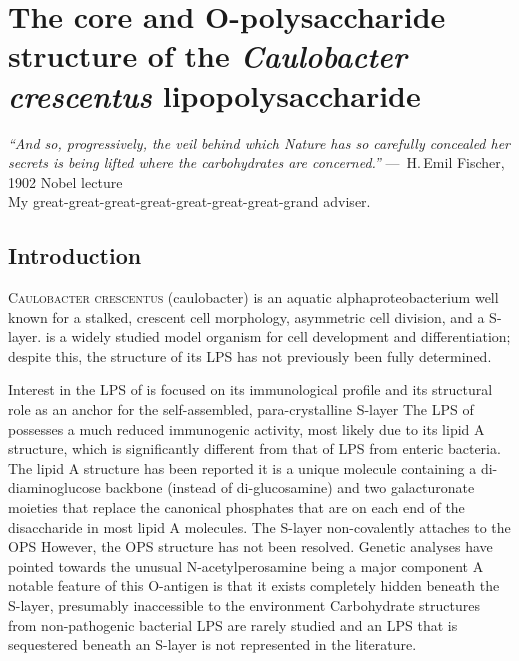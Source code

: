 \acresetall

\chapter{The core and O-polysaccharide structure of the \textit{Caulobacter crescentus} lipopolysaccharide}
\label{ch:lps}
\begin{epigraph}
  \emph{``And so, progressively, the veil behind which Nature has so carefully concealed her secrets
    is being lifted where the carbohydrates are concerned.''} ---~H.\,Emil Fischer, 1902 Nobel
  lecture\\ My great-great-great-great-great-great-great-grand adviser.
\end{epigraph}
\section{Introduction} %
\label{sec:lps_introduction} 
\lettrine[lines=2]{C}{aulobacter crescentus} (\acs{caulobacter}) is an aquatic alphaproteobacterium
well known for a stalked, crescent cell morphology, asymmetric cell division, and a
\ac{S-layer}. \caulobacter is a widely studied model organism for cell development and
differentiation; despite this, the structure of its \ac{LPS} has not previously been fully
determined.

	Interest in the \ac{LPS} of \caulobacter is focused on its immunological
  profile and its structural role as an anchor for the self-assembled,
  para-crystalline \ac{S-layer} The \ac{LPS} of \caulobacter possesses a much
  reduced immunogenic activity, most likely due to its lipid A structure, which is significantly
  different from that of \ac{LPS} from enteric bacteria. The lipid A structure has been
  reported it is a unique molecule containing a di-diaminoglucose
  backbone (instead of di-glucosamine) and two galacturonate moieties that replace the canonical
  phosphates that are on each end of the disaccharide in most lipid A molecules. The \caulobacter
  \ac{S-layer} non-covalently attaches to the \ac{OPS} However, the \ac{OPS}
  structure has not been resolved. Genetic analyses have pointed towards the unusual
  N-acetylperosamine being a major component A notable feature of this
  O-antigen is that it exists completely hidden beneath the S-layer, presumably inaccessible to the
  environment Carbohydrate structures from non-pathogenic bacterial \ac{LPS} are
  rarely studied and an \ac{LPS} that is sequestered beneath an \ac{S-layer} is not represented in
  the literature.
 
